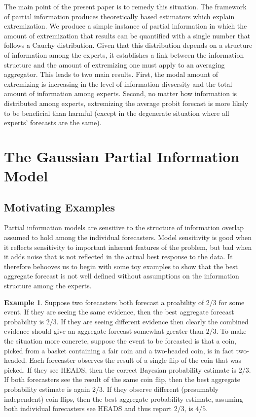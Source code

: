 \documentclass[11pt]{article}
\theoremstyle{definition}
\newtheorem{example}[theorem]{Example}
\theoremstyle{definition}
\begin{document}
The main point of the present paper is to remedy this situation.
The framework of partial information produces theoretically
based estimators which explain extremization.  We produce a 
simple instance of partial information in which the amount of 
extremization that results can be quantified with a single number
that follows a Cauchy distribution.  Given that this distribution
depends on a structure of information among the experts, it establishes
a link between the information structure and the amount of
extremizing one must apply to an averaging aggregator.  This leads
to two main results.  First, the modal amount of extremizing is 
increasing in the level of information divsersity and the total amount 
of information among experts.  Second, no matter how information is 
distributed among experts, extremizing the average probit forecast
is more likely to be beneficial than harmful (except in the degenerate
situation where all experts' forecasts are the same).


\section{The Gaussian Partial Information Model}
\label{sec:model}

\subsection{Motivating Examples}

Partial information models are sensitive to the structure of 
information overlap assumed to hold among the individual 
forecasters.  Model sensitivity is good when it reflects
sensitivity to important inherent features of the problem,
but bad when it adds noise that is not reflected in the
actual best response to the data.  It therefore behooves
us to begin with some toy examples to show that the best
aggregate forecast is not well defined without assumptions
on the information structure among the experts.

\begin{example}
Suppose two forecasters both forecast a proability of $2/3$ for
some event.  If they are seeing the same evidence, then the best
aggregate forecast probability is $2/3$.  If they are seeing
different evidence then clearly the combined evidence should give
an aggregate forecast somewhat greater than $2/3$.  To make the
situation more concrete, suppose the event to be forcasted is that
a coin, picked from a basket containing a fair coin and a two-headed
coin, is in fact two-headed.  Each forecaster observes the result
of a single flip of the coin that was picked.  If they see HEADS,
then the correct Bayesian probability estimate is $2/3$.  If both
forecasters see the result of the same coin flip, then the best
aggregate probability estimate is again $2/3$.  If they observe
different (presumably independent) coin flips, then the best
aggregate probability estimate, assuming both individual forecasters
see HEADS and thus report $2/3$, is $4/5$.  
\end{example}
\end{document}
